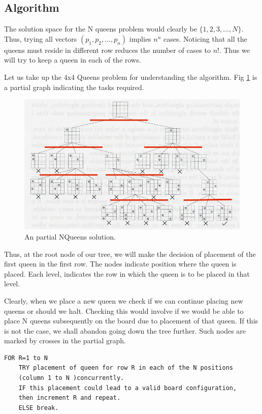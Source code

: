 \documentclass[a4paper]{article}
\begin{document}
\subsection*{Algorithm}
The solution space for the N queens problem would clearly be $\{1, 2, 3,\dots,N\}$. Thus, trying all vectors $(p_{1},p_{2},\dots, p_{n})$ implies $n^n$ cases. Noticing that all the queens must reside in different row reduces the number of cases to $n!$.  Thus we will try to keep a queen in each of the rows.

Let us take up the 4x4 Queens problem for understanding the algorithm. Fig \ref{fig:partialq} is a partial graph indicating the tasks required.
\begin{figure}[ht!]
\centering
\includegraphics[width=130mm]{b.jpg}
\caption{An partial NQueens solution.\label{overflow}}
\label{fig:partialq}
\end{figure}
Thus, at the root node of our tree, we will make the decision of placement of the first queen in the first row. The nodes indicate position where the queen is placed. Each level, indicates the row in which the queen is to be placed in that level.

Clearly, when we place a new queen we check if we can continue placing new queens or should we halt. Checking this would involve if we would be able to place N queens subsequently on the board due to placement of that queen. If this is not the case, we shall abandon going down the tree further. Such nodes are marked by crosses in the partial graph.

\begin{lstlisting}
FOR R=1 to N
	TRY placement of queen for row R in each of the N positions
	(column 1 to N )concurrently.
	IF this placement could lead to a valid board configuration,
	then increment R and repeat.
    ELSE break.
\end{lstlisting}
\end{document}
